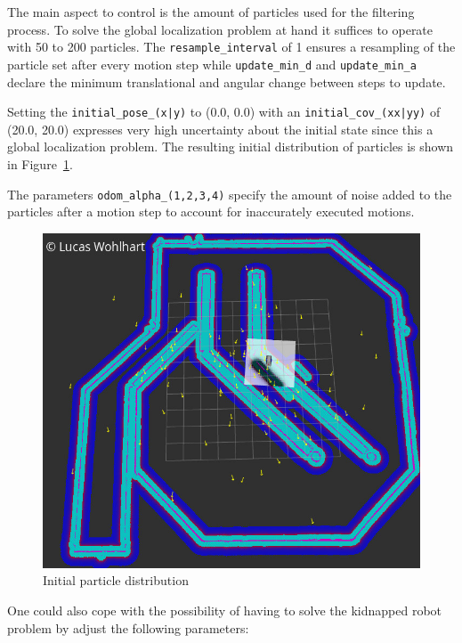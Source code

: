 \documentclass[10pt,journal,compsoc]{IEEEtran}
\begin{document}
The main aspect to control is the amount of particles used for the filtering process. To solve the global localization problem at hand it suffices to operate with 50 to 200 particles. The \texttt{resample\_interval} of 1 ensures a resampling of the particle set after every motion step while \texttt{update\_min\_d} and \texttt{update\_min\_a} declare the minimum translational and angular change between steps to update.

Setting the \texttt{initial\_pose\_(x|y)} to (0.0, 0.0) with an \texttt{initial\_cov\_(xx|yy)} of (20.0, 20.0) expresses very high uncertainty about the initial state since this a global localization problem. The resulting initial distribution of particles is shown in Figure~\ref{fig:particles_initial_high_cov}.

The parameters \texttt{odom\_alpha\_(1,2,3,4)} specify the amount of noise added to the particles after a motion step to account for inaccurately executed motions. 

\begin{figure}[thpb]
      \centering
      \includegraphics[width=\linewidth]{img/particles_initial_high_cov}
      \caption{Initial particle distribution}
      \label{fig:particles_initial_high_cov}
\end{figure}

One could also cope with the possibility of having to solve the kidnapped robot problem by adjust the following parameters:
\end{document}
